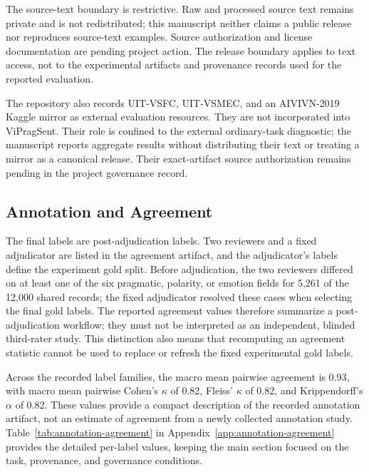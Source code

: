 The source-text boundary is restrictive. Raw and processed source text remains private and is not redistributed; this manuscript neither claims a public release nor reproduces source-text examples. Source authorization and license documentation are pending project action. The release boundary applies to text access, not to the experimental artifacts and provenance records used for the reported evaluation.

The repository also records UIT-VSFC, UIT-VSMEC, and an AIVIVN-2019 Kaggle mirror as external evaluation resources. They are not incorporated into ViPragSent. Their role is confined to the external ordinary-task diagnostic; the manuscript reports aggregate results without distributing their text or treating a mirror as a canonical release. Their exact-artifact source authorization remains pending in the project governance record.

\subsection{Annotation and Agreement}

The final labels are post-adjudication labels.
Two reviewers and a fixed adjudicator are listed in the agreement artifact, and the adjudicator's labels define the experiment gold split.
Before adjudication, the two reviewers differed on at least one of the six pragmatic, polarity, or emotion fields for 5,261 of the 12,000 shared records; the fixed adjudicator resolved these cases when selecting the final gold labels.
The reported agreement values therefore summarize a post-adjudication workflow; they must not be interpreted as an independent, blinded third-rater study. This distinction also means that recomputing an agreement statistic cannot be used to replace or refresh the fixed experimental gold labels.

Across the recorded label families, the macro mean pairwise agreement is 0.93, with macro mean pairwise Cohen's $\kappa$ of 0.82, Fleiss' $\kappa$ of 0.82, and Krippendorff's $\alpha$ of 0.82.
These values provide a compact description of the recorded annotation artifact, not an estimate of agreement from a newly collected annotation study. Table~\ref{tab:annotation-agreement} in Appendix~\ref{app:annotation-agreement} provides the detailed per-label values, keeping the main section focused on the task, provenance, and governance conditions.
